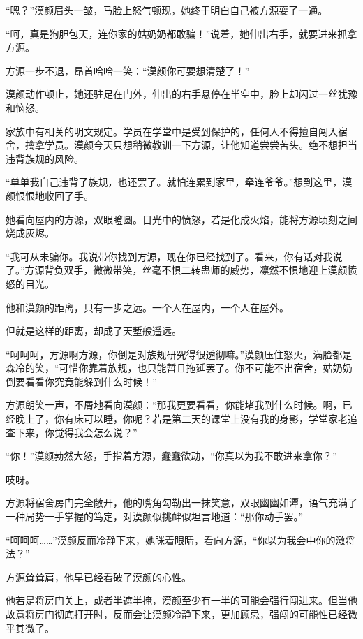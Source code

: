 
\begin{this_body}

“嗯？”漠颜眉头一皱，马脸上怒气顿现，她终于明白自己被方源耍了一通。

“呵，真是狗胆包天，连你家的姑奶奶都敢骗！”说着，她伸出右手，就要进来抓拿方源。

方源一步不退，昂首哈哈一笑：“漠颜你可要想清楚了！”

漠颜动作顿止，她还驻足在门外，伸出的右手悬停在半空中，脸上却闪过一丝犹豫和恼怒。

家族中有相关的明文规定。学员在学堂中是受到保护的，任何人不得擅自闯入宿舍，擒拿学员。漠颜今天只想稍微教训一下方源，让他知道尝尝苦头。绝不想担当违背族规的风险。

“单单我自己违背了族规，也还罢了。就怕连累到家里，牵连爷爷。”想到这里，漠颜恨恨地收回了手。

她看向屋内的方源，双眼瞪圆。目光中的愤怒，若是化成火焰，能将方源顷刻之间烧成灰烬。

“我可从未骗你。我说带你找到方源，现在你已经找到了。看来，你有话对我说了。”方源背负双手，微微带笑，丝毫不惧二转蛊师的威势，凛然不惧地迎上漠颜愤怒的目光。

他和漠颜的距离，只有一步之远。一个人在屋内，一个人在屋外。

但就是这样的距离，却成了天堑般遥远。

“呵呵呵，方源啊方源，你倒是对族规研究得很透彻嘛。”漠颜压住怒火，满脸都是森冷的笑，“可惜你靠着族规，也只能暂且拖延罢了。你不可能不出宿舍，姑奶奶倒要看看你究竟能躲到什么时候！”

方源朗笑一声，不屑地看向漠颜：“那我更要看看，你能堵我到什么时候。啊，已经晚上了，你有床可以睡，你呢？若是第二天的课堂上没有我的身影，学堂家老追查下来，你觉得我会怎么说？”

“你！”漠颜勃然大怒，手指着方源，蠢蠢欲动，“你真以为我不敢进来拿你？”

吱呀。

方源将宿舍房门完全敞开，他的嘴角勾勒出一抹笑意，双眼幽幽如潭，语气充满了一种局势一手掌握的笃定，对漠颜似挑衅似坦言地道：“那你动手罢。”

“呵呵呵……”漠颜反而冷静下来，她眯着眼睛，看向方源，“你以为我会中你的激将法？”

方源耸耸肩，他早已经看破了漠颜的心性。

他若是将房门关上，或者半遮半掩，漠颜至少有一半的可能会强行闯进来。但当他故意将房门彻底打开时，反而会让漠颜冷静下来，更加顾忌，强闯的可能性已经微乎其微了。


\end{this_body}
